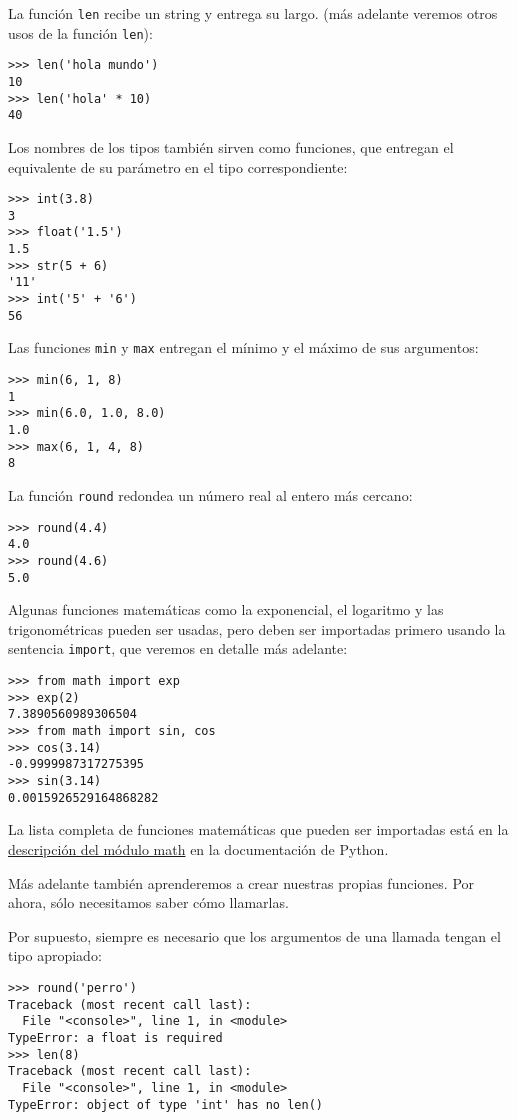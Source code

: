La función \lstinline!len! recibe un string y entrega su largo. (más
adelante veremos otros usos de la función \lstinline!len!):

\begin{lstlisting}
>>> len('hola mundo')
10
>>> len('hola' * 10)
40
\end{lstlisting}

Los nombres de los tipos también sirven como funciones, que entregan el
equivalente de su parámetro en el tipo correspondiente:

\begin{lstlisting}
>>> int(3.8)
3
>>> float('1.5')
1.5
>>> str(5 + 6)
'11'
>>> int('5' + '6')
56
\end{lstlisting}

Las funciones \lstinline!min! y \lstinline!max! entregan el mínimo y el
máximo de sus argumentos:

\begin{lstlisting}
>>> min(6, 1, 8)
1
>>> min(6.0, 1.0, 8.0)
1.0
>>> max(6, 1, 4, 8)
8
\end{lstlisting}

La función \lstinline!round! redondea un número real al entero más
cercano:

\begin{lstlisting}
>>> round(4.4)
4.0
>>> round(4.6)
5.0
\end{lstlisting}

Algunas funciones matemáticas como la exponencial, el logaritmo y las
trigonométricas pueden ser usadas, pero deben ser importadas primero
usando la sentencia \lstinline!import!, que veremos en detalle más
adelante:

\begin{lstlisting}
>>> from math import exp
>>> exp(2)
7.3890560989306504
>>> from math import sin, cos
>>> cos(3.14)
-0.9999987317275395
>>> sin(3.14)
0.0015926529164868282
\end{lstlisting}

La lista completa de funciones matemáticas que pueden ser importadas
está en la \href{http://docs.python.org/library/math.html}{descripción
del módulo math} en la documentación de Python.

Más adelante también aprenderemos a crear nuestras propias funciones.
Por ahora, sólo necesitamos saber cómo llamarlas.

Por supuesto, siempre es necesario que los argumentos de una llamada
tengan el tipo apropiado:

\begin{lstlisting}
>>> round('perro')
Traceback (most recent call last):
  File "<console>", line 1, in <module>
TypeError: a float is required
>>> len(8)
Traceback (most recent call last):
  File "<console>", line 1, in <module>
TypeError: object of type 'int' has no len()
\end{lstlisting}

